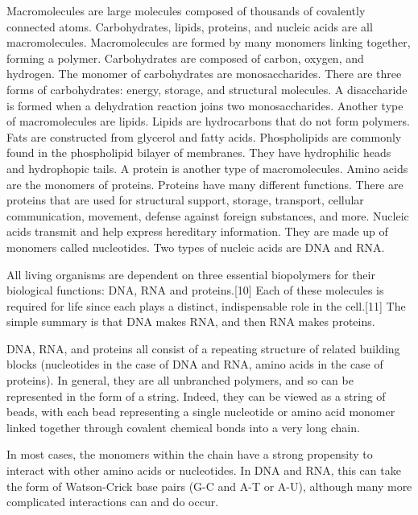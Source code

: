 \documentclass[
]{book}
\begin{document}
Macromolecules are large molecules composed of thousands of covalently connected atoms. Carbohydrates, lipids, proteins, and nucleic acids are all macromolecules. Macromolecules are formed by many monomers linking together, forming a polymer. Carbohydrates are composed of carbon, oxygen, and hydrogen. The monomer of carbohydrates are monosaccharides. There are three forms of carbohydrates: energy, storage, and structural molecules. A disaccharide is formed when a dehydration reaction joins two monosaccharides. Another type of macromolecules are lipids. Lipids are hydrocarbons that do not form polymers. Fats are constructed from glycerol and fatty acids. Phospholipids are commonly found in the phospholipid bilayer of membranes. They have hydrophilic heads and hydrophopic tails. A protein is another type of macromolecules. Amino acids are the monomers of proteins. Proteins have many different functions. There are proteins that are used for structural support, storage, transport, cellular communication, movement, defense against foreign substances, and more. Nucleic acids transmit and help express hereditary information. They are made up of monomers called nucleotides. Two types of nucleic acids are DNA and RNA.

All living organisms are dependent on three essential biopolymers for their biological functions: DNA, RNA and proteins.{[}10{]} Each of these molecules is required for life since each plays a distinct, indispensable role in the cell.{[}11{]} The simple summary is that DNA makes RNA, and then RNA makes proteins.

DNA, RNA, and proteins all consist of a repeating structure of related building blocks (nucleotides in the case of DNA and RNA, amino acids in the case of proteins). In general, they are all unbranched polymers, and so can be represented in the form of a string. Indeed, they can be viewed as a string of beads, with each bead representing a single nucleotide or amino acid monomer linked together through covalent chemical bonds into a very long chain.

In most cases, the monomers within the chain have a strong propensity to interact with other amino acids or nucleotides. In DNA and RNA, this can take the form of Watson-Crick base pairs (G-C and A-T or A-U), although many more complicated interactions can and do occur.
\end{document}
